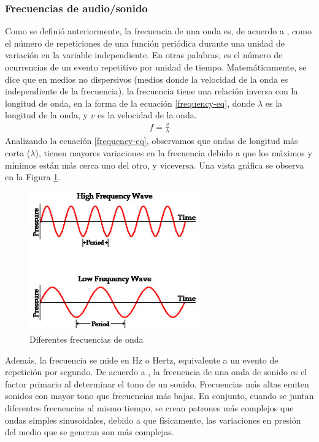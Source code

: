 \documentclass[12pt, letterpaper]{article}
\begin{document}
\subsubsection{Frecuencias de audio/sonido}
Como se definió anteriormente, la frecuencia de una onda es, de acuerdo a \cite{university-physics}, como el número de repeticiones 
    de una función periódica durante una unidad de variación en la variable independiente. En otras palabras, es el número de 
    ocurrencias de un evento repetitivo por unidad de tiempo. Matemáticamente, se dice que en medios no dispersivos (medios donde 
    la velocidad de la onda es independiente de la frecuencia), la frecuencia tiene una relación inversa con la longitud 
    de onda, en la forma de la ecuación \ref{frequency-eq}, donde $\lambda$ es la longitud de la onda, y $v$ es la velocidad de la onda.
    \begin{align}
    f = \frac{v}{\lambda}
    \label{frequency-eq}
    \end{align}Analizando la ecuación \ref{frequency-eq}, observamos que ondas de longitud más corta ($\lambda$), 
    tienen mayores variaciones en la frecuencia debido a que los máximos y mínimos están más cerca uno del otro, y viceversa. Una vista gráfica 
    se observa en la Figura \ref{frecuencias-onda}. 
    \begin{figure}[H]
      \centering
      \includegraphics[height = 6cm]{imgs/investigacion/frecuencias-ondas.jpg}
      \caption{Diferentes frecuencias de onda}
      \label{frecuencias-onda}
    \end{figure}
    Además, la frecuencia se mide en Hz o Hertz, equivalente a un evento de repetición por segundo. De acuerdo a \cite{university-physics}, 
    la frecuencia de una onda de sonido es el factor primario al determinar el tono de un sonido. Frecuencias 
    más altas emiten sonidos con mayor tono que frecuencias más bajas. En conjunto, cuando se juntan diferentes frecuencias 
    al mismo tiempo, se crean patrones más complejos que ondas simples sinusoidales, debido a que físicamente, las variaciones en presión 
    del medio que se generan son más complejas. 
\end{document}
